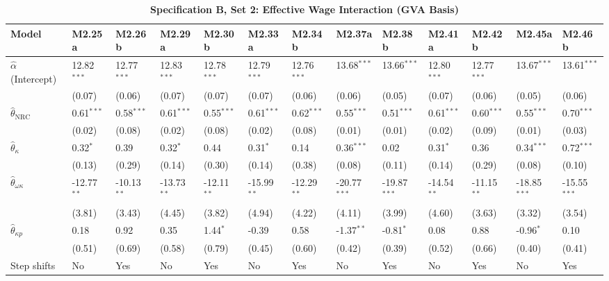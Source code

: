 \FloatBarrier
\begin{table}[h!]
\centering
\caption{\textbf{Specification B, Set 2: Effective Wage Interaction (GVA Basis)}}
\label{tab:specB_set2_gva_app}
\tiny
\setlength{\tabcolsep}{1.5pt}
\begin{tabular}{p{3.2cm}p{1.0cm}p{1.0cm}p{1.0cm}p{1.0cm}p{1.0cm}p{1.0cm}p{1.0cm}p{1.0cm}p{1.0cm}p{1.0cm}p{1.0cm}p{1.0cm}}
\toprule
Model & M2.25a & M2.26b & M2.29a & M2.30b & M2.33a & M2.34b & M2.37a & M2.38b & M2.41a & M2.42b & M2.45a & M2.46b \\
\midrule
$\hat{\alpha}$ (Intercept) & 12.82$^{***}$ & 12.77$^{***}$ & 12.83$^{***}$ & 12.78$^{***}$ & 12.79$^{***}$ & 12.76$^{***}$ & 13.68$^{***}$ & 13.66$^{***}$ & 12.80$^{***}$ & 12.77$^{***}$ & 13.67$^{***}$ & 13.61$^{***}$ \\
 & (0.07) & (0.06) & (0.07) & (0.07) & (0.07) & (0.06) & (0.06) & (0.05) & (0.07) & (0.06) & (0.05) & (0.06) \\
$\hat{\theta}_{\text{NRC}}$ & 0.61$^{***}$ & 0.58$^{***}$ & 0.61$^{***}$ & 0.55$^{***}$ & 0.61$^{***}$ & 0.62$^{***}$ & 0.55$^{***}$ & 0.51$^{***}$ & 0.61$^{***}$ & 0.60$^{***}$ & 0.55$^{***}$ & 0.70$^{***}$ \\
 & (0.02) & (0.08) & (0.02) & (0.08) & (0.02) & (0.08) & (0.01) & (0.01) & (0.02) & (0.09) & (0.01) & (0.03) \\
$\hat{\theta}_{\kappa}$ & 0.32$^{*}$ & 0.39 & 0.32$^{*}$ & 0.44 & 0.31$^{*}$ & 0.14 & 0.36$^{***}$ & 0.02 & 0.31$^{*}$ & 0.36 & 0.34$^{***}$ & 0.72$^{***}$ \\
 & (0.13) & (0.29) & (0.14) & (0.30) & (0.14) & (0.38) & (0.08) & (0.11) & (0.14) & (0.29) & (0.08) & (0.10) \\
$\hat{\theta}_{\omega\kappa}$ & -12.77$^{**}$ & -10.13$^{**}$ & -13.73$^{**}$ & -12.11$^{**}$ & -15.99$^{**}$ & -12.29$^{**}$ & -20.77$^{***}$ & -19.87$^{***}$ & -14.54$^{**}$ & -11.15$^{**}$ & -18.85$^{***}$ & -15.55$^{***}$ \\
 & (3.81) & (3.43) & (4.45) & (3.82) & (4.94) & (4.22) & (4.11) & (3.99) & (4.60) & (3.63) & (3.32) & (3.54) \\
$\hat{\theta}_{\kappa p}$ & 0.18 & 0.92 & 0.35 & 1.44$^{*}$ & -0.39 & 0.58 & -1.37$^{**}$ & -0.81$^{*}$ & 0.08 & 0.88 & -0.96$^{*}$ & 0.10 \\
 & (0.51) & (0.69) & (0.58) & (0.79) & (0.45) & (0.60) & (0.42) & (0.39) & (0.52) & (0.66) & (0.40) & (0.41) \\
\midrule
Step shifts & No & Yes & No & Yes & No & Yes & No & Yes & No & Yes & No & Yes \\

\end{tabular}
\end{table}
